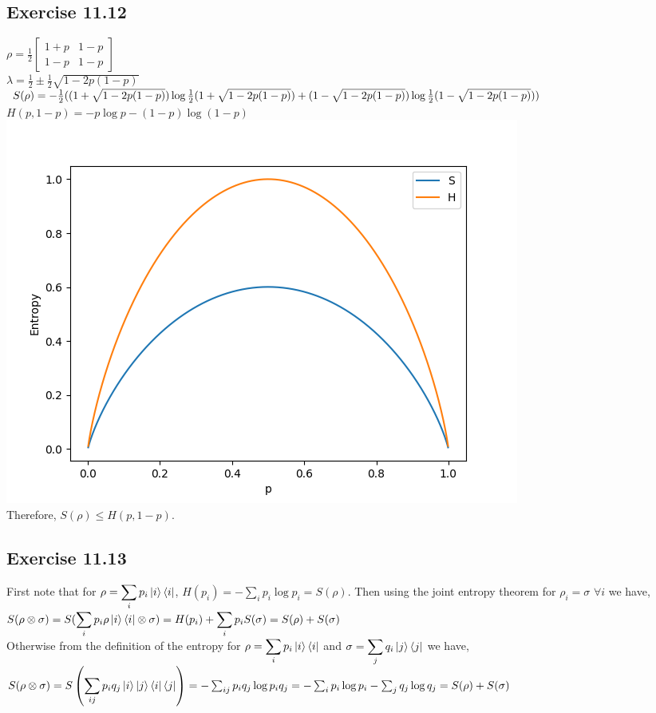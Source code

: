 \documentclass[a4paper,12pt]{article}
\begin{document}
\subsection*{Exercise 11.12}
$\rho=\frac{1}{2}\begin{bmatrix}
    1+p&1-p\\
    1-p&1-p
\end{bmatrix}$\\
$\lambda = \frac{1}{2}\pm\frac{1}{2}\sqrt{1-2p(1-p)}$\\
$S(\rho)=-\frac{1}{2}((1+\sqrt{1-2p(1-p)})\log{\frac{1}{2}(1+\sqrt{1-2p(1-p)})}\\
+(1-\sqrt{1-2p(1-p)})\log{\frac{1}{2}(1-\sqrt{1-2p(1-p)})})$\\
$H(p,1-p)=-p\log{p}-(1-p)\log{(1-p)}$\\
\includegraphics[scale=0.5]{12.png}\\
Therefore, $S(\rho)\leq H(p,1-p)$.
\subsection*{Exercise 11.13}
First note that for $\rho=\displaystyle\sum_i p_i\ket{i}\bra{i}$, 
$H(p_i)=\displaystyle -\sum_ip_i\log{p_i}=S(\rho)$. Then using the joint entropy
theorem for $\rho_i=\sigma$ $\forall i$ we have,\\
$S(\rho\otimes \sigma)=S(\displaystyle\sum_ip_i\rho\ket{i}\bra{i}\otimes \sigma)=
H(p_i)+\sum_ip_iS(\sigma)=S(\rho)+S(\sigma)$\\
Otherwise from the definition of the entropy for 
$\rho=\displaystyle\sum_i p_i\ket{i}\bra{i}$ and
$\sigma=\displaystyle\sum_j q_i\ket{j}\bra{j}$ we have,\\
$S(\rho\otimes \sigma)=S\left(\displaystyle\sum_{ij}p_iq_j\ket{i}\ket{j}\bra{i}\bra{j}\right)=
-\sum_{ij}p_iq_j\log{p_iq_j}=-\sum_ip_i\log{p_i}-\sum_jq_j\log{q_j}=S(\rho)+S(\sigma)$
\end{document}
